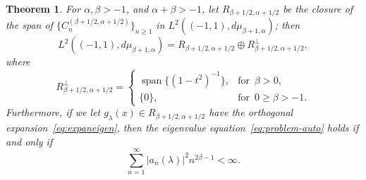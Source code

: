 \documentclass[12pt,a4paper]{amsart}
\theoremstyle{plain}
\newtheorem{Thm}{Theorem}
\theoremstyle{definition}
\newcommand{\spa}{\operatorname{span}}
\begin{document}
\begin{Thm}
For $\alpha,\beta >-1$, and $\alpha+\beta>-1$, let
$R_{\beta+1/2,\alpha+1/2}$ be the closure of the span of
$\{C_n^{(\beta+1/2,\alpha+1/2)}\}_{n\ge 1}$ in
$L^2((-1,1),d\mu_{\beta+1,\alpha})$; then
\begin{equation}
\label{eq:decomL2}
  L^2((-1,1),d\mu_{\beta+1,\alpha})
  = R_{\beta+1/2,\alpha+1/2} \oplus R_{\beta+1/2,\alpha+1/2}^\bot,
\end{equation}
where
\begin{equation}
\label{eq:orto}
  R_{\beta+1/2,\alpha+1/2}^\bot =
\begin{cases}
  \spa\{(1-t^2)^{-1}\}, &\text{for }\, \beta>0,\\
  \{0\}, & \text{for }\, 0\ge \beta>-1.
\end{cases}
\end{equation}
Furthermore, if we let $g_\lambda(x)\in R_{\beta+1/2,\alpha+1/2}$
have the orthogonal expansion~\eqref{eq:expaneigen}, then the
eigenvalue equation~\eqref{eq:problem-auto} holds if and only if
\begin{equation}
\label{eq:conditionproblem}
  \sum_{n=1}^{\infty} |a_n(\lambda)|^2 n^{2\beta-1}<\infty.
\end{equation}
\end{Thm}
\end{document}
